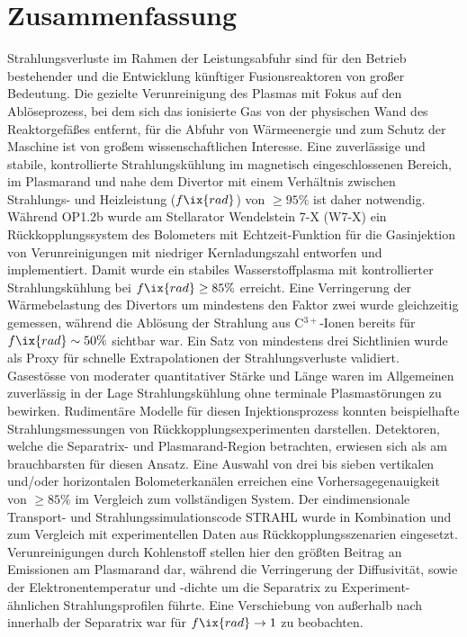 
\checkoddpage\ifoddpage\clearpage\else\cleardoublepage\fi%

    \chapter*{Zusammenfassung}%

        Strahlungsverluste im Rahmen der Leistungsabfuhr sind für den Betrieb bestehender und die Entwicklung künftiger Fusionsreaktoren von großer Bedeutung. Die gezielte Verunreinigung des Plasmas mit Fokus auf den Ablöseprozess, bei dem sich das ionisierte Gas von der physischen Wand des Reaktorgefäßes entfernt, für die Abfuhr von Wärmeenergie und zum Schutz der Maschine ist von großem wissenschaftlichen Interesse. Eine zuverlässige und stabile, kontrollierte Strahlungskühlung im magnetisch eingeschlossenen Bereich, im Plasmarand und nahe dem Divertor mit einem Verhältnis zwischen Strahlungs- und Heizleistung ($f\ix{rad}$) von $\ge95\%$ ist daher notwendig.\\%
        Während OP1.2b wurde am Stellarator Wendelstein 7-X (W7-X) ein Rückkopplungssystem des Bolometers mit Echtzeit-Funktion für die Gasinjektion von Verunreinigungen mit niedriger Kernladungszahl entworfen und implementiert. Damit wurde ein stabiles Wasserstoffplasma mit kontrollierter Strahlungskühlung bei $f\ix{rad}\ge85\%$ erreicht. Eine Verringerung der Wärmebelastung des Divertors um mindestens den Faktor zwei wurde gleichzeitig gemessen, während die Ablösung der Strahlung aus C$^{3+}$-Ionen bereits für $f\ix{rad}\sim50\%$ sichtbar war. Ein Satz von mindestens drei Sichtlinien wurde als Proxy für schnelle Extrapolationen der Strahlungsverluste validiert.\\%
        Gasestösse von moderater quantitativer Stärke und Länge waren im Allgemeinen zuverlässig in der Lage Strahlungskühlung ohne terminale Plasmastörungen zu bewirken. Rudimentäre Modelle für diesen Injektionsprozess konnten beispielhafte Strahlungsmessungen von Rückkopplungsexperimenten darstellen. Detektoren, welche die Separatrix- und Plasmarand-Region betrachten, erwiesen sich als am brauchbarsten für diesen Ansatz. Eine Auswahl von drei bis sieben vertikalen und/oder horizontalen Bolometerkanälen erreichen eine Vorhersagegenauigkeit von $\ge85\%$ im Vergleich zum vollständigen System. Der eindimensionale Transport- und Strahlungssimulationscode STRAHL wurde in Kombination und zum Vergleich mit experimentellen Daten aus Rückkopplungsszenarien eingesetzt. Verunreinigungen durch Kohlenstoff stellen hier den größten Beitrag an Emissionen am Plasmarand dar, während die Verringerung der Diffusivität, sowie der Elektronentemperatur und -dichte um die Separatrix zu Experiment-ähnlichen Strahlungsprofilen führte. Eine Verschiebung von außerhalb nach innerhalb der Separatrix war für $f\ix{rad}\rightarrow1$ zu beobachten.\\%

